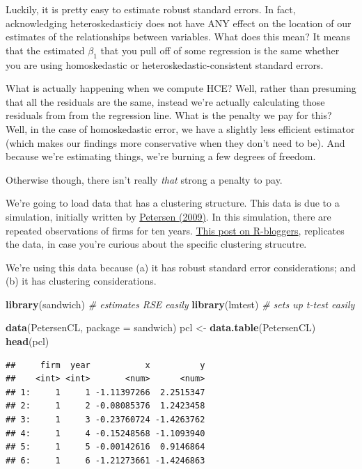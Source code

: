 \documentclass[
]{article}
\newenvironment{Shaded}{\begin{snugshade}}{\end{snugshade}}
\newcommand{\AttributeTok}[1]{\textcolor[rgb]{0.13,0.29,0.53}{#1}}
\newcommand{\CommentTok}[1]{\textcolor[rgb]{0.56,0.35,0.01}{\textit{#1}}}
\newcommand{\FunctionTok}[1]{\textcolor[rgb]{0.13,0.29,0.53}{\textbf{#1}}}
\newcommand{\NormalTok}[1]{#1}
\newcommand{\OtherTok}[1]{\textcolor[rgb]{0.56,0.35,0.01}{#1}}
\newcommand{\StringTok}[1]{\textcolor[rgb]{0.31,0.60,0.02}{#1}}
\theoremstyle{definition}
\theoremstyle{definition}
\theoremstyle{definition}
\theoremstyle{definition}
\theoremstyle{remark}
\begin{document}
Luckily, it is pretty easy to estimate robust standard errors. In fact, acknowledging heteroskedasticiy does not have ANY effect on the location of our estimates of the relationships between variables. What does this mean? It means that the estimated \(\beta_{1}\) that you pull off of some regression is the same whether you are using homoskedastic or heteroskedastic-consistent standard errors.

What is actually happening when we compute HCE? Well, rather than presuming that all the residuals are the same, instead we're actually calculating those residuals from from the regression line. What is the penalty we pay for this? Well, in the case of homoskedastic error, we have a slightly less efficient estimator (which makes our findings more conservative when they don't need to be). And because we're estimating things, we're burning a few degrees of freedom.

Otherwise though, there isn't really \emph{that} strong a penalty to pay.

We're going to load data that has a clustering structure. This data is due to a simulation, initially written by \href{https://academic.oup.com/rfs/article/22/1/435/1585940}{Petersen (2009)}. In this simulation, there are repeated observations of firms for ten years. \href{https://www.r-bloggers.com/2020/04/paper-replication-petersen-2009/}{This post on R-bloggers}, replicates the data, in case you're curious about the specific clustering strucutre.

We're using this data because (a) it has robust standard error considerations; and (b) it has clustering considerations.

\begin{Shaded}
\begin{Highlighting}[]
\FunctionTok{library}\NormalTok{(sandwich) }\CommentTok{\# estimates RSE easily}
\FunctionTok{library}\NormalTok{(lmtest)   }\CommentTok{\# sets up t{-}test easily }

\FunctionTok{data}\NormalTok{(}\StringTok{\textquotesingle{}PetersenCL\textquotesingle{}}\NormalTok{, }\AttributeTok{package =} \StringTok{\textquotesingle{}sandwich\textquotesingle{}}\NormalTok{)}
\NormalTok{pcl }\OtherTok{\textless{}{-}} \FunctionTok{data.table}\NormalTok{(PetersenCL)}
\FunctionTok{head}\NormalTok{(pcl)}
\end{Highlighting}
\end{Shaded}

\begin{verbatim}
##     firm  year           x          y
##    <int> <int>       <num>      <num>
## 1:     1     1 -1.11397266  2.2515347
## 2:     1     2 -0.08085376  1.2423458
## 3:     1     3 -0.23760724 -1.4263762
## 4:     1     4 -0.15248568 -1.1093940
## 5:     1     5 -0.00142616  0.9146864
## 6:     1     6 -1.21273661 -1.4246863
\end{verbatim}
\end{document}
